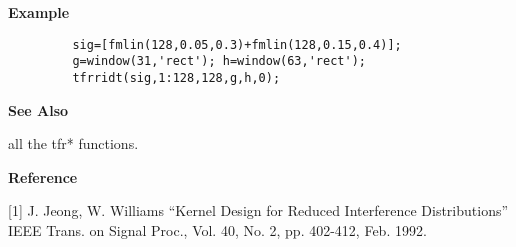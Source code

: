 \newpage

{\bf \large {}\selectfont Example}
\begin{verbatim}
         sig=[fmlin(128,0.05,0.3)+fmlin(128,0.15,0.4)];  
         g=window(31,'rect'); h=window(63,'rect');  
         tfrridt(sig,1:128,128,g,h,0);
\end{verbatim}
\vspace*{.5cm}


{\bf \large {}\selectfont See Also}\\
\hspace*{1.5cm}
\begin{minipage}[t]{13.5cm}
all the {\ty tfr*} functions.
\end{minipage}
\vspace*{.5cm}


{\bf \large {}\selectfont Reference}\\
\hspace*{1.5cm}
\begin{minipage}[t]{13.5cm}
[1] J. Jeong, W. Williams ``Kernel Design for Reduced Interference
Distributions'' IEEE Trans. on Signal Proc., Vol. 40, No. 2, pp. 402-412,
Feb. 1992.
\end{minipage}

